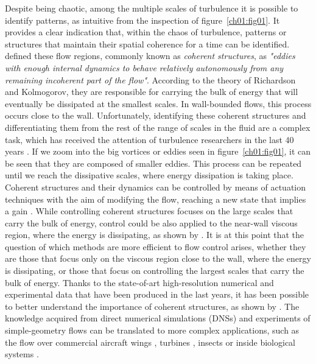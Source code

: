 Despite being chaotic, among the multiple scales of turbulence it is possible to identify patterns, as intuitive from the inspection of figure~\ref{ch01:fig01}.
It provides a clear indication that, within the chaos of turbulence, patterns or structures that maintain their spatial coherence for a time can be identified.
\citet{jimenez2018coherent} defined these flow regions, commonly known as \textit{coherent structures}, as \textit{"eddies with enough internal dynamics to behave relatively autonomously from any remaining incoherent part of the flow"}.
According to the theory of Richardson and Kolmogorov, they are responsible for carrying the bulk of energy that will eventually be dissipated at the smallest scales.
In wall-bounded flows, this process occurs close to the wall.
Unfortunately, identifying these coherent structures and differentiating them from the rest of the range of scales in the fluid are a complex task, which has received the attention of turbulence researchers in the last 40 years \citep{hussain1983coherent,jeong1997coherent,jimenez2012cascades}.
If we zoom into the big vortices or eddies seen in figure~\ref{ch01:fig01}, it can be seen that they are composed of smaller eddies.
This process can be repeated until we reach the dissipative scales, where energy dissipation is taking place.
Coherent structures and their dynamics can be controlled by means of actuation techniques with the aim of modifying the flow, reaching a new state that implies a gain \citep{hof2010eliminating}.
While controlling coherent structures focuses on the large scales that carry the bulk of energy, control could be also applied to the near-wall viscous region, where the energy is dissipating, as shown by \citet{jimenez1994structure}.
It is at this point that the question of which methods are more efficient to flow control arises, whether they are those that focus only on the viscous region close to the wall, where the energy is dissipating, or those that focus on controlling the largest scales that carry the bulk of energy.
Thanks to the state-of-art high-resolution numerical and experimental data that have been produced in the last years, it has been possible to better understand the importance of coherent structures, as shown by \citet{jimenez2018coherent}.
The knowledge acquired from direct numerical simulations (DNSs) and experiments of simple-geometry flows can be translated to more complex applications, such as the flow over commercial aircraft wings \citep{vinuesa2018turbulent}, turbines \citep{ouro2017hydrodynamic}, insects \citep{yao2020forward} or inside biological systems \citep{garcia2021demonstration}.

